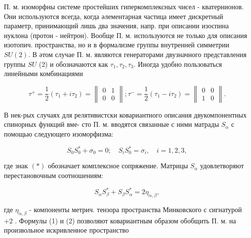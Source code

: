 \documentclass[10pt]{article}
\begin{document}
П. м. изоморфны системе простейших гиперкомплексных чисел - кватернионов. Они используются всегда, когда әлементарная частица имеет дискретный параметр, принимающий лишь два значения, напр. при описании изоспина нуклона (протон - нейтрон). Вообще П. м. используются не только для описания изотопич. пространства, но и в формализме группы внутренней симметрии $S U(2)$. В әтом случае П. м. являются генераторами двузначного представления группы $S U$ (2) и обозначаются как $\tau_{1}, \tau_{2}, \tau_{3}$. Иногда удобно пользоваться линейными комбинациями



\[

\tau^{+}=\frac{1}{2}\left(\tau_{1}+i \tau_{2}\right)=\left\|\begin{array}{ll}

0 & 1 \\

0 & 0

\end{array}\right\| ; \tau^{-}=\frac{1}{2}\left(\tau_{1}-i \tau_{2}\right)=\left\|\begin{array}{ll}

0 & 0 \\

1 & 0

\end{array}\right\| .

\]



В нек-рых случаях для релятивистски ковариантного описания двукомпонентных спинорных функций вме- сто П. м. вводятся связанные с ними матрады $S_{\alpha}$ с помощью следующего изоморфизма:



\[

S_{0} S_{0}^{*}+\sigma_{0}=0 ; \quad S_{i} S_{0}^{*}=\sigma_{i}, \quad i=1,2,3,

\]



где знак $(*)$ обозначает комплексное сопряжение. Матрицы $S_{\alpha}$ удовлетворяют перестановочным соотношениям:



\[

S_{\alpha} S_{\beta}^{*}+S_{\beta} S_{\alpha}^{*}=2 \eta_{\alpha, \beta},

\]



где $\eta_{\alpha, \beta}$ - компоненты метрич. тензора пространства Минковского с сигнатурой +2 . Формулы (1) и (2) позволяют ковариантным образом обобщить П. м. на произвольное искривленное пространство
\end{document}
